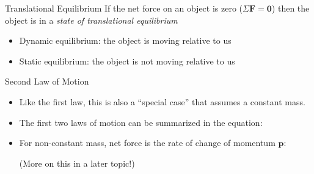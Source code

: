 \documentclass[12pt,compress,aspectratio=169]{beamer}
\newcommand{\eq}[2]{\vspace{#1}{\Large\begin{displaymath}#2\end{displaymath}}}
\begin{document}
\begin{frame}{Translational Equilibrium}
  If the net force on an object is zero ($\Sigma\bm{F}=\bm{0}$) then the
  object is in a \emph{state of translational equilibrium}
  \begin{itemize}
  \item Dynamic equilibrium: the object is moving relative to us
  \item Static equilibrium: the object is not moving relative to us
  \end{itemize}
\end{frame}



\begin{frame}{Second Law of Motion}
  \begin{center}
  \end{center}
  \begin{itemize}
  \item\textcolor{red!80!black}{Like the first law, this is also a
    ``special case'' that assumes a constant mass.}
  \item The first two laws of motion can be summarized in the equation:

    \eq{-.2in}{
      \boxed{\bm{F}_\text{net}=\Sigma\bm{F}=m\bm{a}}
    }
  \item For non-constant mass, net force is the rate of change of momentum
    $\bm{p}$:

    \eq{-.2in}{
      \boxed{
        \bm{F}_\text{net}=\diff{\bm{p}}t
      }
    }

    \vspace{-.1in}(More on this in a later topic!)
  \end{itemize}
\end{frame}
\end{document}
